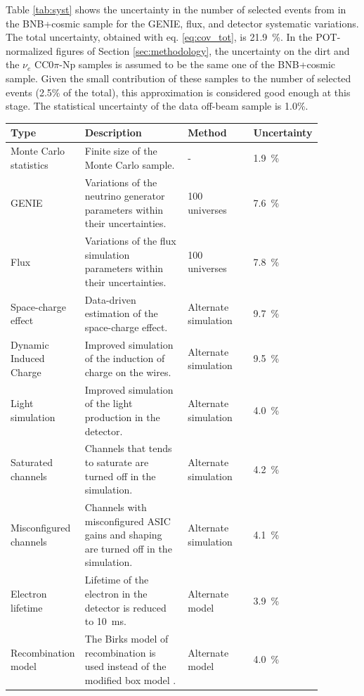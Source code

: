 \vspace{1em}
Table \ref{tab:syst} shows the uncertainty in the number of selected events from in the BNB+cosmic sample for the GENIE, flux, and detector systematic variations. The total uncertainty, obtained with eq. \ref{eq:cov_tot}, is 21.9~\%. In the POT-normalized figures of Section \ref{sec:methodology}, the uncertainty on the dirt and the $\nu_{e}$ CC$0\pi$-Np samples is assumed to be the same one of the BNB+cosmic sample. Given the small contribution of these samples to the number of selected events (2.5\% of the total), this approximation is considered good enough at this stage. The statistical uncertainty of the data off-beam sample is 1.0\%. 

\begin{table}[htbp]
   \centering
   \begin{tabular}{p{0.23\linewidth}p{0.33\linewidth}p{0.21\linewidth}p{0.11\linewidth}}
     \toprule
     Type & Description & Method & Uncertainty \\
     \midrule
     Monte Carlo statistics & Finite size of the Monte Carlo sample. & - & 1.9~\%\\
     GENIE & Variations of the neutrino generator parameters within their uncertainties. & 100 universes & 7.6~\%\\
     Flux & Variations of the flux simulation parameters within their uncertainties. & 100 universes & 7.8~\%\\
     Space-charge effect & Data-driven estimation of the space-charge effect. & Alternate simulation & 9.7~\%\\
     Dynamic Induced Charge & Improved simulation of the induction of charge on the wires. & Alternate simulation & 9.5~\%\\
     Light simulation & Improved simulation of the light production in the detector. & Alternate simulation & 4.0~\%\\
     Saturated channels & Channels that tends to saturate are turned off in the simulation. & Alternate simulation & 4.2~\%\\
     Misconfigured channels & Channels with misconfigured ASIC gains and shaping are turned off in the simulation. & Alternate simulation & 4.1~\%\\
     Electron lifetime & Lifetime of the electron in the detector is reduced to 10~ms. & Alternate model & 3.9~\%\\
     Recombination model & The Birks model of recombination \cite{birks} is used instead of the modified box model \cite{boxmodel}. & Alternate model & 4.0~\%\\

\end{tabular}
\end{table}
